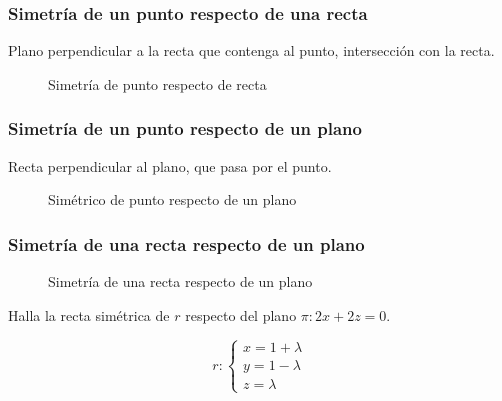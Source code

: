 \subsubsection{Simetría de un punto respecto de una recta}

Plano perpendicular a la recta que contenga al punto, intersección con la recta.

\begin{figure}[hbtp]
\centering
{}

\label{fig::sim::punto-recta}
\caption{Simetría de punto respecto de recta}
\end{figure}


\subsubsection{Simetría de un punto respecto de un plano}

Recta perpendicular al plano, que pasa por el punto.

\begin{figure}[hbtp]
\centering
{}

\label{fig::sim::punto-plano}
\caption{Simétrico de punto respecto de un plano}
\end{figure}



\subsubsection{Simetría de una recta respecto de un plano}

\begin{figure}[hbtp]
\centering
{}

\label{fig::sim::recta-plano}
\caption{Simetría de una recta respecto de un plano}
\end{figure}


\begin{problem}

Halla la recta simétrica de $r$ respecto del plano $\pi: 2x+2z=0$.

\[r: \begin{cases}x=1+\lambda\\y=1-\lambda\\z=\lambda\end{cases}\]

\solution


\end{problem}


